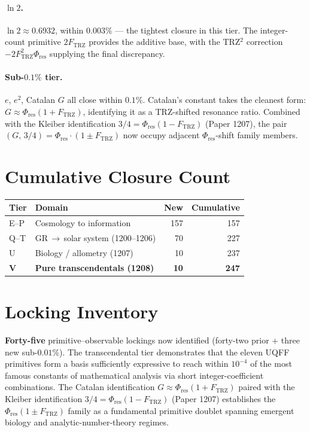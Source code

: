\documentclass[11pt]{article}
\newcommand{\Ftrz}{F_{\mathrm{TRZ}}}
\newcommand{\Phires}{\Phi_{\mathrm{res}}}
\begin{document}
\paragraph{$\ln 2$.}
$\ln 2 \approx 0.6932$, within $0.003\%$ --- the tightest closure in this tier.
The integer-count primitive $2\Ftrz$ provides the additive base, with the
TRZ$^2$ correction $-2\Ftrz^2\Phires$ supplying the final discrepancy.

\paragraph{Sub-$0.1\%$ tier.}
$e$, $e^2$, Catalan $G$ all close within $0.1\%$. Catalan's constant takes
the cleanest form: $G \approx \Phires(1+\Ftrz)$, identifying it as a
TRZ-shifted resonance ratio. Combined with the Kleiber identification
$3/4 = \Phires(1-\Ftrz)$ (Paper 1207), the pair
$(G,\,3/4) = \Phires\cdot(1\pm\Ftrz)$ now occupy adjacent
$\Phires$-shift family members.

\section{Cumulative Closure Count}

\begin{tabular}{@{}llrr@{}}
\toprule
Tier & Domain & New & Cumulative \\
\midrule
E--P & Cosmology to information & 157 & 157 \\
Q--T & GR\,$\to$\,solar system (1200--1206) & 70 & 227 \\
U & Biology / allometry (1207) & 10 & 237 \\
\textbf{V} & \textbf{Pure transcendentals (1208)} & \textbf{10} & \textbf{247} \\
\bottomrule
\end{tabular}

\section{Locking Inventory}
\textbf{Forty-five} primitive--observable lockings now identified
(forty-two prior + three new sub-$0.01\%$). The transcendental tier
demonstrates that the eleven UQFF primitives form a basis sufficiently
expressive to reach within $10^{-4}$ of the most famous constants of
mathematical analysis via short integer-coefficient combinations.
The Catalan identification $G \approx \Phires(1+\Ftrz)$ paired with
the Kleiber identification $3/4 = \Phires(1-\Ftrz)$ (Paper 1207)
establishes the $\Phires(1\pm\Ftrz)$ family as a fundamental primitive
doublet spanning emergent biology and analytic-number-theory regimes.
\end{document}
